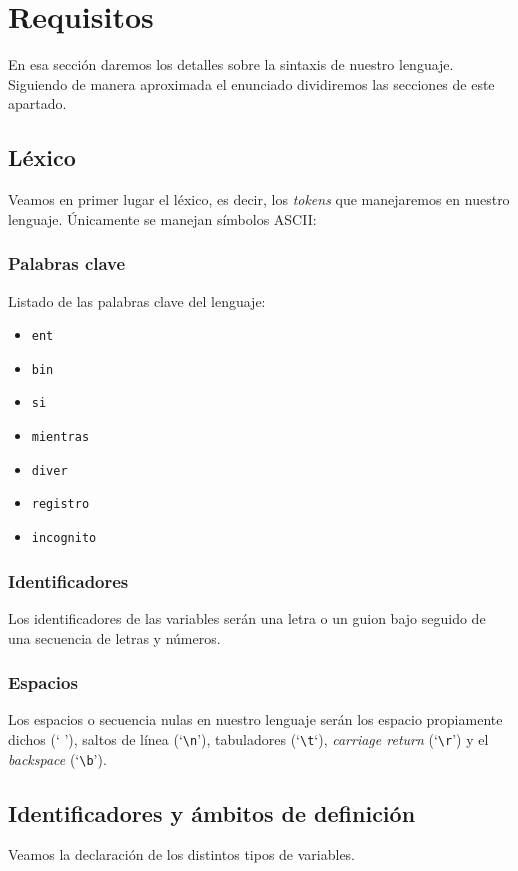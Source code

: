 \chapter*{Requisitos}
En esa sección daremos los detalles sobre la sintaxis de nuestro lenguaje.
Siguiendo de manera aproximada el enunciado dividiremos las secciones de este
apartado.

\section*{Léxico}
Veamos en primer lugar el léxico, es decir, los \textit{tokens} que manejaremos
en nuestro lenguaje. Únicamente se manejan símbolos ASCII:
\subsection*{Palabras clave}
Listado de las palabras clave del lenguaje:
\begin{itemize}
    \item \lstinline{ent}
    \item \lstinline{bin}
    \item \lstinline{si}
    \item \lstinline{mientras}
    \item \lstinline{diver}
    \item \lstinline{registro}
    \item \lstinline{incognito}
\end{itemize}

\subsection*{Identificadores}
Los identificadores de las variables serán una letra o un guion bajo seguido de
una secuencia de letras y números.

\subsection*{Espacios}
Los espacios o secuencia nulas en nuestro lenguaje serán los espacio propiamente
dichos (` '), saltos de línea (`\lstinline{\n}'), tabuladores
(`\lstinline{\t}`), \textit{carriage return} (`\lstinline{\r}') y el
\textit{backspace} (`\lstinline{\b}').

\section*{Identificadores y ámbitos de definición}
Veamos la declaración de los distintos tipos de variables.
